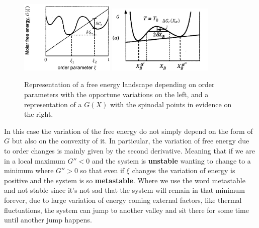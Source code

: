 \begin{figure}[t]
    \centering
    \includegraphics[width=0.4\textwidth]{Immagini/GVarXi.png}
    \includegraphics[width=0.45\textwidth]{Immagini/SpinodalPoints.png}
    \caption{
        Representation of a free energy landscape depending on order parameters with the opportune variations on the left, and a representation of a $G(X)$ with the spinodal points in evidence on the right.
    }
    \label{fig:FirstPhaseTrans}
\end{figure}
In this case the variation of the free energy do not simply depend on the form of $G$ but also on the convexity of it. In particular, the variation of free energy due to order changes is mainly given by the second derivative. Meaning that if we are in a local maximum $G'' < 0$ and the system is \textbf{unstable} wanting to change to a minimum where $G'' > 0$ so that even if $\xi$ changes the variation of energy is positive and the system is so \textbf{metastable}. Where we use the word metastable and not stable since it's not sad that the system will remain in that minimum forever, due to large variation of energy coming external factors, like thermal fluctuations, the system can jump to another valley and sit there for some time until another jump happens.

